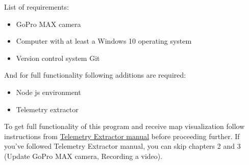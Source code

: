 \documentclass[a4paper,12pt]{book}
\begin{document}
\pagebreak
List of requirements:
\begin{itemize}
	\item GoPro MAX camera
	\item Computer with at least a Windows 10 operating system
	\item Version control system Git
\end{itemize}
And for full functionality following additions are required:
\begin{itemize}
	\item Node js environment
	\item Telemetry extractor
\end{itemize}
To get full functionality of this program and receive map visualization follow instructions from \href{https://github.com/miloszwojciechowski/Open-vslam-project/tree/main/Manuals/Telemetry_extractor}{Telemetry Extractor manual} before proceeding further. If you've followed Telemetry Extractor manual, you can skip chapters 2 and 3 (Update GoPro MAX camera, Recording a video).
\end{document}
